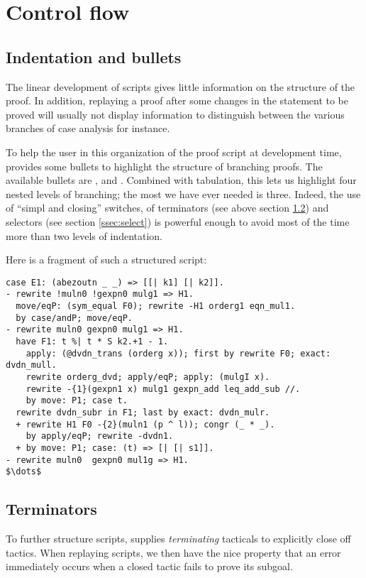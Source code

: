\section{Control flow}
\subsection{Indentation and bullets}\label{ssec:indent}

The linear development of \Coq{} scripts gives little information on
the structure of the proof. In addition, replaying a proof after some
changes in the statement to be proved will usually not display information to
distinguish between the various branches of case analysis for instance.

To help the user in this organization of the proof script at
development time, \ssr{} provides some bullets to highlight the
structure of branching proofs. The available bullets are \C{-},
\C{+} and \C{*}. Combined with tabulation, this lets us highlight four
nested levels of branching; the most we have ever
needed is three. Indeed, the use of ``simpl and closing'' switches, of
terminators (see above section \ref{ssec:termin}) and selectors (see
 section \ref{ssec:select}) is powerful enough
to avoid most of the time more than two levels of indentation.

Here is a fragment of such a structured script:

\begin{lstlisting}
case E1: (abezoutn _ _) => [[| k1] [| k2]].
- rewrite !muln0 !gexpn0 mulg1 => H1.
  move/eqP: (sym_equal F0); rewrite -H1 orderg1 eqn_mul1.
  by case/andP; move/eqP.
- rewrite muln0 gexpn0 mulg1 => H1.
  have F1: t %| t * S k2.+1 - 1.
    apply: (@dvdn_trans (orderg x)); first by rewrite F0; exact: dvdn_mull.
    rewrite orderg_dvd; apply/eqP; apply: (mulgI x).
    rewrite -{1}(gexpn1 x) mulg1 gexpn_add leq_add_sub //.
    by move: P1; case t.
  rewrite dvdn_subr in F1; last by exact: dvdn_mulr.
  + rewrite H1 F0 -{2}(muln1 (p ^ l)); congr (_ * _).
    by apply/eqP; rewrite -dvdn1.
  + by move: P1; case: (t) => [| [| s1]].
- rewrite muln0  gexpn0 mul1g => H1.
$\dots$
\end{lstlisting}

\subsection{Terminators}\label{ssec:termin}
To further structure scripts, \ssr{}
supplies \emph{terminating} tacticals to explicitly close off tactics.
When replaying scripts, we then have the nice property that
an error immediately occurs when a closed tactic fails to prove its
subgoal.

